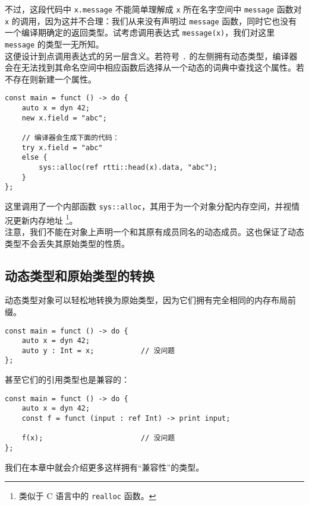 不过，这段代码中 \lstinline!x.message! 不能简单理解成 \lstinline!x! 所在名字空间中 \lstinline!message! 函数对 \lstinline!x! 的调用，因为这并不合理：我们从来没有声明过 \lstinline!message! 函数，同时它也没有一个编译期确定的返回类型。试考虑调用表达式 \lstinline!message(x)!，我们对这里 \lstinline!message! 的类型一无所知。 \\

这便设计到点调用表达式的另一层含义。若符号 \lstinline!.! 的左侧拥有动态类型，编译器会在无法找到其命名空间中相应函数后选择从一个动态的词典中查找这个属性。若不存在则新建一个属性。

\begin{minipage}[c]{0.95\textwidth}
\vspace{1.0em}
\begin{lstlisting}
const main = funct () -> do {
    auto x = dyn 42;
    new x.field = "abc";
    
    // 编译器会生成下面的代码：
    try x.field = "abc"
    else {
        sys::alloc(ref rtti::head(x).data, "abc");
    }
};
\end{lstlisting}
\end{minipage}

这里调用了一个内部函数 \lstinline!sys::alloc!，其用于为一个对象分配内存空间，并视情况更新内存地址 \footnote{类似于 C 语言中的 \lstinline!realloc! 函数。}。 \\

注意，我们不能在对象上声明一个和其原有成员同名的动态成员。这也保证了动态类型不会丢失其原始类型的性质。

\subsection{动态类型和原始类型的转换}

动态类型对象可以轻松地转换为原始类型，因为它们拥有完全相同的内存布局前缀。

\begin{lstlisting}
const main = funct () -> do {
	auto x = dyn 42;
	auto y : Int = x;			// 没问题
};
\end{lstlisting}

甚至它们的引用类型也是兼容的：

\begin{lstlisting}
const main = funct () -> do {
	auto x = dyn 42;
	const f = funct (input : ref Int) -> print input;
	
	f(x);						// 没问题
};
\end{lstlisting}

我们在本章中就会介绍更多这样拥有“兼容性”的类型。


